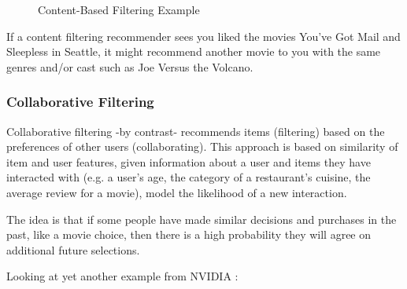 \begin{figure}[H]
    \centering
    \caption{Content-Based Filtering Example}
    \label{fig:content-based-filtering-example}
\end{figure}

If a content filtering recommender sees you liked the movies You've Got Mail and Sleepless in Seattle, it might recommend another movie to you with the same genres and/or cast such as Joe Versus the Volcano.

\subsubsection*{Collaborative Filtering}

Collaborative filtering -by contrast- recommends items (filtering) based on the preferences of other users (collaborating).
This approach is based on similarity of item and user features,  given information about a user and items they have interacted with (e.g. a user's age, the category of a restaurant's cuisine, the average review for a movie),  model the likelihood of a new interaction.

The idea is that if some people have made similar decisions and purchases in the past, like a movie choice, then there is a high probability they will agree on additional future selections.

Looking at yet another example from NVIDIA \cite{nvidia}:


